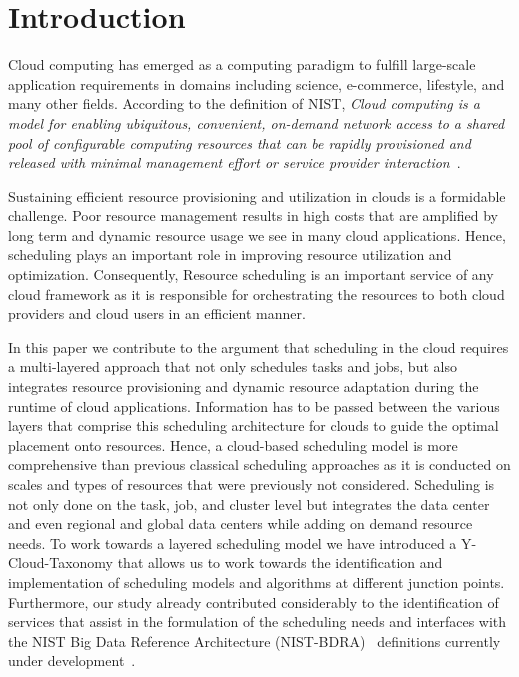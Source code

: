 \documentclass[final,5p,times,twocolumn]{elsarticle}
\begin{document}
\section{Introduction}


Cloud computing has emerged as a computing paradigm to fulfill large-scale
application requirements in domains including science, e-commerce, lifestyle,
and many other fields. According to the definition of NIST, {\em Cloud computing
is a model for enabling ubiquitous, convenient, on-demand network access to a
shared pool of configurable computing resources that can be rapidly provisioned
and released with minimal management effort or service provider
interaction}~\cite{mell2011nist}.

Sustaining efficient resource provisioning and utilization in clouds is a
formidable challenge. Poor resource management results in high costs that are
amplified by long term and dynamic resource usage we see in many cloud
applications. Hence, scheduling plays an important role in improving resource
utilization and optimization. Consequently, Resource scheduling is an important
service of any cloud framework as it is responsible for orchestrating the
resources to both cloud providers and cloud users in an efficient manner.

In this paper we contribute to the argument that scheduling in the
cloud requires a multi-layered approach that not only schedules tasks
and jobs, but also integrates resource provisioning and dynamic
resource adaptation during the runtime of cloud
applications. Information has to be passed between the various layers
that comprise this scheduling architecture for clouds to guide the
optimal placement onto resources. Hence, a cloud-based scheduling
model is more comprehensive than previous classical scheduling
approaches as it is conducted on scales and types of resources that
were previously not considered. Scheduling is not only done on the
task, job, and cluster level but integrates the data center and even
regional and global data centers while adding on demand resource
needs. To work towards a layered scheduling model we have introduced a
Y-Cloud-Taxonomy that allows us to work towards the identification and
implementation of scheduling models and algorithms at different
junction points.  Furthermore, our study already contributed
considerably to the identification of services that assist in the
formulation of the scheduling needs and interfaces with the NIST Big
Data Reference Architecture (NIST-BDRA)~\cite{nist-bdra-vol6}
definitions currently under development~\cite{nist-bdra-vol8}.
\end{document}
